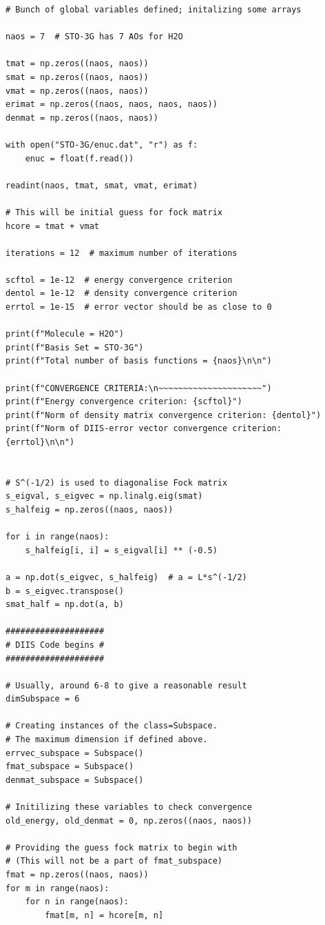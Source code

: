 \begin{lstlisting}[style=MyPython]
# Bunch of global variables defined; initalizing some arrays

naos = 7  # STO-3G has 7 AOs for H2O

tmat = np.zeros((naos, naos))
smat = np.zeros((naos, naos))
vmat = np.zeros((naos, naos))
erimat = np.zeros((naos, naos, naos, naos))
denmat = np.zeros((naos, naos))

with open("STO-3G/enuc.dat", "r") as f:
    enuc = float(f.read())

readint(naos, tmat, smat, vmat, erimat)

# This will be initial guess for fock matrix
hcore = tmat + vmat

iterations = 12  # maximum number of iterations

scftol = 1e-12  # energy convergence criterion
dentol = 1e-12  # density convergence criterion
errtol = 1e-15  # error vector should be as close to 0

print(f"Molecule = H2O")
print(f"Basis Set = STO-3G")
print(f"Total number of basis functions = {naos}\n\n")

print(f"CONVERGENCE CRITERIA:\n~~~~~~~~~~~~~~~~~~~~~")
print(f"Energy convergence criterion: {scftol}")
print(f"Norm of density matrix convergence criterion: {dentol}")
print(f"Norm of DIIS-error vector convergence criterion: {errtol}\n\n")


# S^(-1/2) is used to diagonalise Fock matrix
s_eigval, s_eigvec = np.linalg.eig(smat)
s_halfeig = np.zeros((naos, naos))

for i in range(naos):
    s_halfeig[i, i] = s_eigval[i] ** (-0.5)

a = np.dot(s_eigvec, s_halfeig)  # a = L*s^(-1/2)
b = s_eigvec.transpose()
smat_half = np.dot(a, b)

####################
# DIIS Code begins #
####################

# Usually, around 6-8 to give a reasonable result
dimSubspace = 6

# Creating instances of the class=Subspace.
# The maximum dimension if defined above.
errvec_subspace = Subspace()
fmat_subspace = Subspace()
denmat_subspace = Subspace()

# Initilizing these variables to check convergence
old_energy, old_denmat = 0, np.zeros((naos, naos))

# Providing the guess fock matrix to begin with
# (This will not be a part of fmat_subspace)
fmat = np.zeros((naos, naos))
for m in range(naos):
    for n in range(naos):
        fmat[m, n] = hcore[m, n]


\end{lstlisting}
